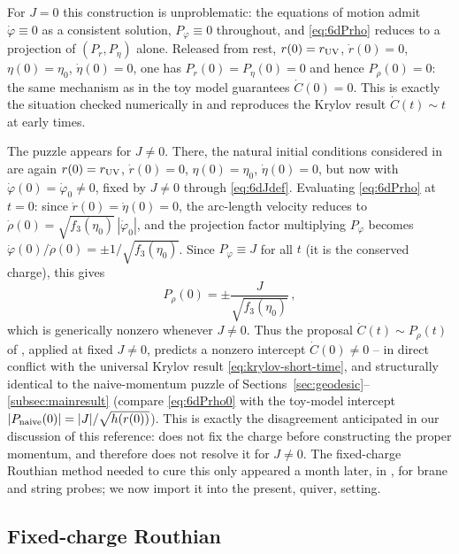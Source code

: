 \documentclass[11pt]{article}
\begin{document}
For $J=0$ this construction is unproblematic: the equations of motion admit $\dot\varphi\equiv0$ as a consistent solution, $P_\varphi\equiv0$ throughout, and \eqref{eq:6dPrho} reduces to a projection of $(P_r,P_\eta)$ alone. Released from rest, $r(0)=r_{\rm UV}$, $\dot r(0)=0$, $\eta(0)=\eta_0$, $\dot\eta(0)=0$, one has $P_r(0)=P_\eta(0)=0$ and hence $P_\rho(0)=0$: the same mechanism as in the toy model guarantees $\dot C(0)=0$. This is exactly the situation checked numerically in \cite{Fatemiabhari:2026rob} and reproduces the Krylov result $\dot C(t)\sim t$ at early times.

The puzzle appears for $J\neq0$. There, the natural initial conditions considered in \cite{Fatemiabhari:2026rob} are again $r(0)=r_{\rm UV}$, $\dot r(0)=0$, $\eta(0)=\eta_0$, $\dot\eta(0)=0$, but now with $\dot\varphi(0)=\dot\varphi_0\neq0$, fixed by $J\neq0$ through \eqref{eq:6dJdef}. Evaluating \eqref{eq:6dPrho} at $t=0$: since $\dot r(0)=\dot\eta(0)=0$, the arc-length velocity reduces to $\dot\rho(0)=\sqrt{f_3(\eta_0)}\,|\dot\varphi_0|$, and the projection factor multiplying $P_\varphi$ becomes $\dot\varphi(0)/\dot\rho(0)=\pm1/\sqrt{f_3(\eta_0)}$. Since $P_\varphi\equiv J$ for all $t$ (it is the conserved charge), this gives
\begin{equation}
P_\rho(0) = \pm\frac{J}{\sqrt{f_3(\eta_0)}}\,,
\label{eq:6dPrho0}
\end{equation}
which is generically nonzero whenever $J\neq0$. Thus the proposal $\dot C(t)\sim P_\rho(t)$ of \cite{Fatemiabhari:2026rob}, applied at fixed $J\neq0$, predicts a nonzero intercept $\dot C(0)\neq0$ -- in direct conflict with the universal Krylov result \eqref{eq:krylov-short-time}, and structurally identical to the naive-momentum puzzle of Sections~\ref{sec:geodesic}--\ref{subsec:mainresult} (compare \eqref{eq:6dPrho0} with the toy-model intercept $|P_{\rm naive}(0)|=|J|/\sqrt{h(r(0))}$). This is exactly the disagreement anticipated in our discussion of this reference: \cite{Fatemiabhari:2026rob} does not fix the charge before constructing the proper momentum, and therefore does not resolve it for $J\neq0$. The fixed-charge Routhian method needed to cure this only appeared a month later, in \cite{Chatzis:2026ekd}, for brane and string probes; we now import it into the present, quiver, setting.

\subsection{Fixed-charge Routhian}
\label{subsec:6dRouthian}
\end{document}
